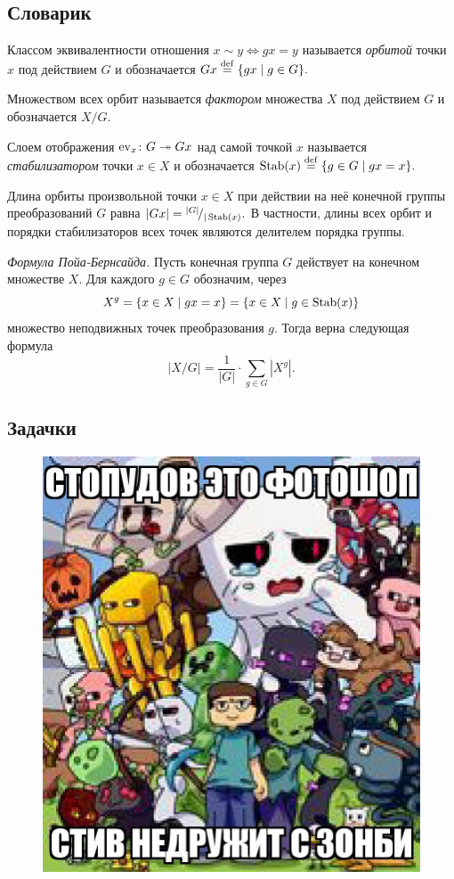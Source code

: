 \documentclass[10pt]{article}
\begin{document}
\subsection*{Словарик}
\begin{bullets}
    \item Классом эквивалентности отношения $x \sim y \iff gx = y$ называется \emph{орбитой} точки $x$ под действием $G$ и обозначается 
    \(Gx \overset{\footnotesize{\mathrm{def}}}{=} \{gx \mid g \in G\}.\)

    Множеством всех орбит называется \emph{фактором} множества $X$ под действием $G$ и обозначается $X/G$.

    \item Слоем отображения $\operatorname{ev}_x \colon G \twoheadrightarrow Gx$ над самой точкой $x$ называется \emph{стабилизатором} точки $x \in X$ и обозначается \( \operatorname{Stab}(x) \overset{\footnotesize{\mathrm{def}}}{=} \{g \in G \mid gx = x \}.\)
    
    \item Длина орбиты произвольной точки $x \in X$ при действии на неё конечной группы преобразований $G$ равна $|Gx| = {}^{|G|}\!/_{|\operatorname{Stab}(x)}.$ В частности, длины всех орбит и порядки стабилизаторов всех точек являются делителем порядка группы.

    \item \emph{Формула Пойа-Бернсайда.} Пусть конечная группа $G$ действует на конечном множестве $X$. Для каждого $g \in G$ обозначим, через $$X^g = \{x \in X \mid gx = x \} = \{ x \in X \mid g \in \operatorname{Stab}(x)\}$$ множество неподвижных точек  преобразования $g$. Тогда верна следующая формула \[
            |X/G| = \frac{1}{|G|} \cdot \sum_{g \in G}|X^g|.
        \]
\end{bullets}
\subsection*{Задачки} 

\vfill
\begin{figure}[ht]
    \centering
    \includegraphics[width=0.7\linewidth]{../images/photo_2025-07-25_17-51-18.jpg}
\end{figure}
\vfill
\end{document}
